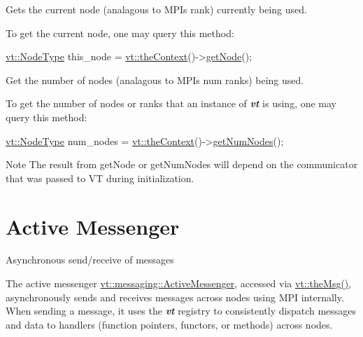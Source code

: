 Gets the current node (analagous to M\+PI\textquotesingle{}s rank) currently being used.

To get the current node, one may query this method\+:


\begin{DoxyCode}
\hyperlink{namespacevt_a866da9d0efc19c0a1ce79e9e492f47e2}{vt::NodeType} this\_node = \hyperlink{namespacevt_a26551fe0e6e6a1371111df5b12c7e92c}{vt::theContext}()->\hyperlink{structvt_1_1ctx_1_1_context_a0d52c263ce8516546a67443d9a86fa5f}{getNode}();
\end{DoxyCode}


Get the number of nodes (analagous to M\+PI\textquotesingle{}s num ranks) being used.

To get the number of nodes or ranks that an instance of {\bfseries {\itshape vt}} is using, one may query this method\+:


\begin{DoxyCode}
\hyperlink{namespacevt_a866da9d0efc19c0a1ce79e9e492f47e2}{vt::NodeType} num\_nodes = \hyperlink{namespacevt_a26551fe0e6e6a1371111df5b12c7e92c}{vt::theContext}()->\hyperlink{structvt_1_1ctx_1_1_context_a7f41071aadf6d5fa9e1b6c703c5ff19d}{getNumNodes}();
\end{DoxyCode}


\begin{DoxyNote}{Note}
The result from {\ttfamily get\+Node} or {\ttfamily get\+Num\+Nodes} will depend on the communicator that was passed to VT during initialization. 
\end{DoxyNote}
\hypertarget{active-messenger}{}\section{Active Messenger}\label{active-messenger}
Asynchronous send/receive of messages

The active messenger {\ttfamily \hyperlink{structvt_1_1messaging_1_1_active_messenger}{vt\+::messaging\+::\+Active\+Messenger}}, accessed via {\ttfamily \hyperlink{namespacevt_aeafd31f866aeb4dc6fc2f6ee97136350}{vt\+::the\+Msg()}}, asynchronously sends and receives messages across nodes using M\+PI internally. When sending a message, it uses the {\bfseries {\itshape vt}} registry to consistently dispatch messages and data to handlers (function pointers, functors, or methods) across nodes.

